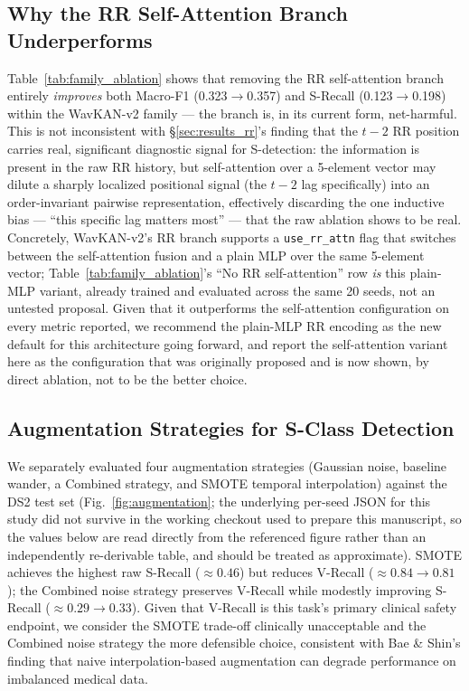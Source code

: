\documentclass[journal,twoside,web]{ieeecolor}
\begin{document}
\subsection{Why the RR Self-Attention Branch Underperforms}
\label{sec:discussion_rr}
Table~\ref{tab:family_ablation} shows that removing the RR self-attention branch entirely \emph{improves} both Macro-F1 (0.323$\to$0.357) and S-Recall (0.123$\to$0.198) within the WavKAN-v2 family --- the branch is, in its current form, net-harmful. This is not inconsistent with \S\ref{sec:results_rr}'s finding that the $t-2$ RR position carries real, significant diagnostic signal for S-detection: the information is present in the raw RR history, but self-attention over a 5-element vector may dilute a sharply localized positional signal (the $t-2$ lag specifically) into an order-invariant pairwise representation, effectively discarding the one inductive bias --- ``this specific lag matters most'' --- that the raw ablation shows to be real. Concretely, WavKAN-v2's RR branch supports a \texttt{use\_rr\_attn} flag that switches between the self-attention fusion and a plain MLP over the same 5-element vector; Table~\ref{tab:family_ablation}'s ``No RR self-attention'' row \emph{is} this plain-MLP variant, already trained and evaluated across the same 20 seeds, not an untested proposal. Given that it outperforms the self-attention configuration on every metric reported, we recommend the plain-MLP RR encoding as the new default for this architecture going forward, and report the self-attention variant here as the configuration that was originally proposed and is now shown, by direct ablation, not to be the better choice.

\subsection{Augmentation Strategies for S-Class Detection}
We separately evaluated four augmentation strategies (Gaussian noise, baseline wander, a Combined strategy, and SMOTE temporal interpolation) against the DS2 test set (Fig.~\ref{fig:augmentation}; the underlying per-seed JSON for this study did not survive in the working checkout used to prepare this manuscript, so the values below are read directly from the referenced figure rather than an independently re-derivable table, and should be treated as approximate). SMOTE achieves the highest raw S-Recall ($\approx0.46$) but reduces V-Recall ($\approx0.84\to0.81$); the Combined noise strategy preserves V-Recall while modestly improving S-Recall ($\approx0.29\to0.33$). Given that V-Recall is this task's primary clinical safety endpoint, we consider the SMOTE trade-off clinically unacceptable and the Combined noise strategy the more defensible choice, consistent with Bae \& Shin's \cite{bae_handling_2025} finding that naive interpolation-based augmentation can degrade performance on imbalanced medical data.
\end{document}
